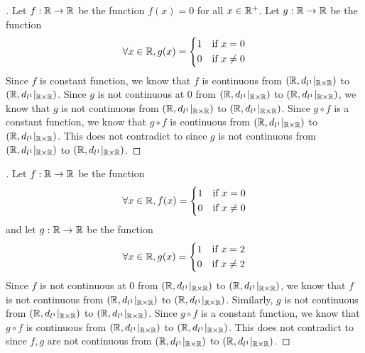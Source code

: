 \begin{proof}[]
  Let \(f : \mathbb{R} \to \mathbb{R}\) be the function \(f(x) = 0\) for all \(x \in \mathbb{R}^+\).
  Let \(g : \mathbb{R} \to \mathbb{R}\) be the function
  \[
    \forall x \in \mathbb{R}, g(x) = \begin{dcases}
      1 & \text{if } x = 0    \\
      0 & \text{if } x \neq 0
    \end{dcases}
  \]
  Since \(f\) is constant function, we know that \(f\) is continuous from \((\mathbb{R}, d_{l^1}|_{\mathbb{R} \times \mathbb{R}})\) to \((\mathbb{R}, d_{l^1}|_{\mathbb{R} \times \mathbb{R}})\).
  Since \(g\) is not continuous at \(0\) from \((\mathbb{R}, d_{l^1}|_{\mathbb{R} \times \mathbb{R}})\) to \((\mathbb{R}, d_{l^1}|_{\mathbb{R} \times \mathbb{R}})\), we know that \(g\) is not continuous from \((\mathbb{R}, d_{l^1}|_{\mathbb{R} \times \mathbb{R}})\) to \((\mathbb{R}, d_{l^1}|_{\mathbb{R} \times \mathbb{R}})\).
  Since \(g \circ f\) is a constant function, we know that \(g \circ f\) is continuous from \((\mathbb{R}, d_{l^1}|_{\mathbb{R} \times \mathbb{R}})\) to \((\mathbb{R}, d_{l^1}|_{\mathbb{R} \times \mathbb{R}})\).
  This does not contradict to  since \(g\) is not continuous from \((\mathbb{R}, d_{l^1}|_{\mathbb{R} \times \mathbb{R}})\) to \((\mathbb{R}, d_{l^1}|_{\mathbb{R} \times \mathbb{R}})\).
\end{proof}

\begin{proof}[]
  Let \(f : \mathbb{R} \to \mathbb{R}\) be the function
  \[
    \forall x \in \mathbb{R}, f(x) = \begin{dcases}
      1 & \text{if } x = 0    \\
      0 & \text{if } x \neq 0
    \end{dcases}
  \]
  and let \(g : \mathbb{R} \to \mathbb{R}\) be the function
  \[
    \forall x \in \mathbb{R}, g(x) = \begin{dcases}
      1 & \text{if } x = 2    \\
      0 & \text{if } x \neq 2
    \end{dcases}
  \]
  Since \(f\) is not continuous at \(0\) from \((\mathbb{R}, d_{l^1}|_{\mathbb{R} \times \mathbb{R}})\) to \((\mathbb{R}, d_{l^1}|_{\mathbb{R} \times \mathbb{R}})\), we know that \(f\) is not continuous from \((\mathbb{R}, d_{l^1}|_{\mathbb{R} \times \mathbb{R}})\) to \((\mathbb{R}, d_{l^1}|_{\mathbb{R} \times \mathbb{R}})\).
  Similarly, \(g\) is not continuous from \((\mathbb{R}, d_{l^1}|_{\mathbb{R} \times \mathbb{R}})\) to \((\mathbb{R}, d_{l^1}|_{\mathbb{R} \times \mathbb{R}})\).
  Since \(g \circ f\) is a constant function, we know that \(g \circ f\) is continuous from \((\mathbb{R}, d_{l^1}|_{\mathbb{R} \times \mathbb{R}})\) to \((\mathbb{R}, d_{l^1}|_{\mathbb{R} \times \mathbb{R}})\).
  This does not contradict to  since \(f, g\) are not continuous from \((\mathbb{R}, d_{l^1}|_{\mathbb{R} \times \mathbb{R}})\) to \((\mathbb{R}, d_{l^1}|_{\mathbb{R} \times \mathbb{R}})\).
\end{proof}


